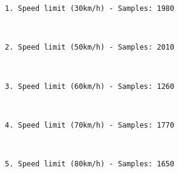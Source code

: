\documentclass[11pt]{article}
\begin{document}
    \begin{Verbatim}[commandchars=\\\{\}]
1. Speed limit (30km/h) - Samples: 1980

    \end{Verbatim}

    \begin{center}
    \end{center}
    { \hspace*{\fill} \\}
    
    \begin{Verbatim}[commandchars=\\\{\}]
2. Speed limit (50km/h) - Samples: 2010

    \end{Verbatim}

    \begin{center}
    \end{center}
    { \hspace*{\fill} \\}
    
    \begin{Verbatim}[commandchars=\\\{\}]
3. Speed limit (60km/h) - Samples: 1260

    \end{Verbatim}

    \begin{center}
    \end{center}
    { \hspace*{\fill} \\}
    
    \begin{Verbatim}[commandchars=\\\{\}]
4. Speed limit (70km/h) - Samples: 1770

    \end{Verbatim}

    \begin{center}
    \end{center}
    { \hspace*{\fill} \\}
    
    \begin{Verbatim}[commandchars=\\\{\}]
5. Speed limit (80km/h) - Samples: 1650

    \end{Verbatim}
\end{document}
